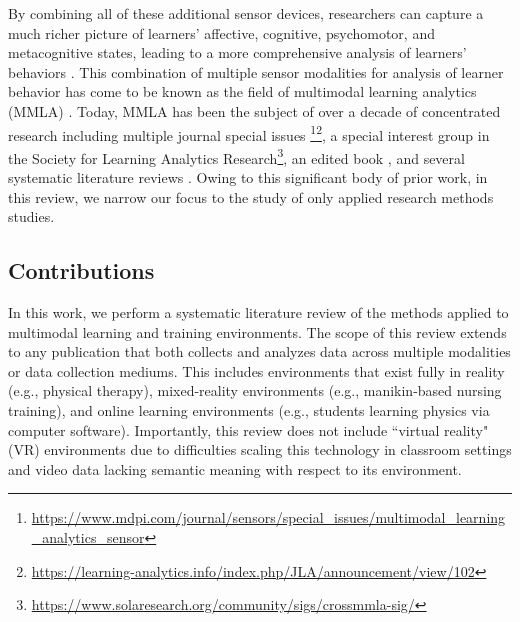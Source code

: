 \documentclass[manuscript,screen,review]{acmart}
\begin{document}
By combining all of these additional sensor devices, researchers can capture a much richer picture of learners' affective, cognitive, psychomotor, and metacognitive states, leading to a more comprehensive analysis of learners' behaviors \cite{blikstein2016multimodal}. This combination of multiple sensor modalities for analysis of learner behavior has come to be known as the field of multimodal learning analytics (MMLA) \cite{blikstein2013multimodal, blikstein2016multimodal, worsley_multimodal_2018}. Today, MMLA has been the subject of over a decade of concentrated research including multiple journal special issues \cite{BJETSpecialIssue}\footnote{\href{https://www.mdpi.com/journal/sensors/special_issues/multimodal_learning_analytics_sensor}{https://www.mdpi.com/journal/sensors/special\_issues/multimodal\_learning\_analytics\_sensor}}\footnote{\href{https://learning-analytics.info/index.php/JLA/announcement/view/102}{https://learning-analytics.info/index.php/JLA/announcement/view/102}}, a special interest group in the Society for Learning Analytics Research\footnote{\href{https://www.solaresearch.org/community/sigs/crossmmla-sig/}{https://www.solaresearch.org/community/sigs/crossmmla-sig/}}, an edited book \cite{MMLAHandbook}, and several systematic literature reviews \cite{Chango2022, Alwahaby2022, Shankar2018, Crescenzi2020, Mu2020, DiMitri2018, worsley_multimodal_2018}. Owing to this significant body of prior work, in this review, we narrow our focus to the study of only applied research methods studies.

\subsection{Contributions} \label{subsec:contributions}

In this work, we perform a systematic literature review of the methods applied to multimodal learning and training environments. The scope of this review extends to any publication that both collects and analyzes data across multiple modalities or data collection mediums. This includes environments that exist fully in reality (e.g., physical therapy), mixed-reality environments (e.g., manikin-based nursing training), and online learning environments (e.g., students learning physics via computer software). Importantly, this review does not include ``virtual reality" (VR) environments due to difficulties scaling this technology in classroom settings \cite{cook2019challenges} and video data lacking semantic meaning with respect to its environment.
\end{document}
